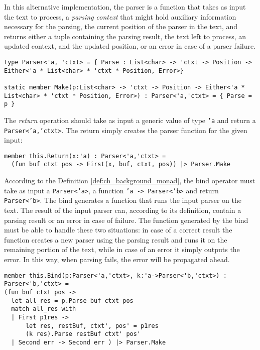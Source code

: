 In this alternative implementation, the parser is a function that takes as input the text to process, a \textit{parsing context} that might hold auxiliary information necessary for the parsing, the current position of the parser in the text, and returns either a tuple containing the parsing result, the text left to process, an updated context, and the updated position, or an error in case of a parser failure.

\begin{lstlisting}
type Parser<'a, 'ctxt> = { Parse : List<char> -> 'ctxt -> Position -> Either<'a * List<char> * 'ctxt * Position, Error>}

static member Make(p:List<char> -> 'ctxt -> Position -> Either<'a * List<char> * 'ctxt * Position, Error>) : Parser<'a,'ctxt> = { Parse = p }
\end{lstlisting}

The \textit{return} operation should take as input a generic value of type \texttt{'a} and return a \texttt{Parser<'a,'ctxt>}. The return simply creates the parser function for the given input:

\begin{lstlisting}
member this.Return(x:'a) : Parser<'a,'ctxt> =
  (fun buf ctxt pos -> First(x, buf, ctxt, pos)) |> Parser.Make
\end{lstlisting}

According to the Definition \ref{def:ch_background_monad}, the bind operator must take as input a \texttt{Parser<'a>}, a function \texttt{'a -> Parser<'b>} and return \texttt{Parser<'b>}. The bind generates a function that runs the input parser on the text. The result of the input parser can, according to its definition, contain a parsing result or an error in case of failure. The function generated by the bind must be able to handle these two situations: in case of a correct result the function creates a new parser using the parsing result and runs it on the remaining portion of the text, while in case of an error it simply outputs the error. In this way, when parsing fails, the error will be propagated ahead.

\begin{lstlisting}
member this.Bind(p:Parser<'a,'ctxt>, k:'a->Parser<'b,'ctxt>) : Parser<'b,'ctxt> =
(fun buf ctxt pos ->
  let all_res = p.Parse buf ctxt pos
  match all_res with
  | First p1res ->
      let res, restBuf, ctxt', pos' = p1res
      (k res).Parse restBuf ctxt' pos'
  | Second err -> Second err ) |> Parser.Make
\end{lstlisting}

